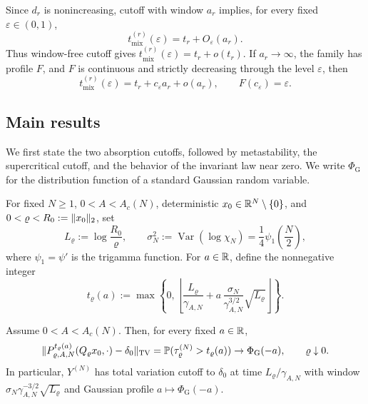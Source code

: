 \documentclass[11pt,reqno,a4paper]{article}
\newcommand{\Pp}{\P}
\newcommand{\TV}{\mathrm{TV}}
\DeclareMathOperator{\Var}{Var}
\begin{document}
\begin{remark}
  Since $d_r$ is nonincreasing, cutoff with window $a_r$ implies, for every
  fixed $\varepsilon\in(0,1)$,
  \begin{equation*}
    t_{\mathrm{mix}}^{(r)}(\varepsilon)
    =
    t_r+O_\varepsilon(a_r).
  \end{equation*}
  Thus window-free cutoff gives
  $t_{\mathrm{mix}}^{(r)}(\varepsilon)=t_r+o(t_r)$. If $a_r\to\infty$, the
  family has profile $F$, and $F$ is continuous and strictly decreasing
  through the level $\varepsilon$, then
  \begin{equation*}
    t_{\mathrm{mix}}^{(r)}(\varepsilon)
    =
    t_r+c_\varepsilon a_r+o(a_r),
    \qquad
    F(c_\varepsilon)=\varepsilon.
  \end{equation*}
\end{remark}

\subsection{Main results}
\label{subsec:main-results}

We first
state the two absorption cutoffs, followed by metastability, the supercritical
cutoff, and the behavior of the invariant law near zero. We write
$\Phi_{\mathrm G}$ for the distribution function of a standard Gaussian
random variable.

For fixed $N\geq1$, $0<A<A_c(N)$, deterministic
$x_0\in\mathbb{R}^N\setminus\{0\}$, and $0<\varrho<R_0:=\lVert x_0\rVert_2$, set
\begin{equation*}
  L_\varrho:=\log\frac{R_0}{\varrho},
  \qquad
  \sigma_N^2:=\Var(\log\chi_N)
  =\frac14\psi_1\left(\frac N2\right),
\end{equation*}
where $\psi_1=\psi'$ is the trigamma function. For $a\in\mathbb{R}$, define the
nonnegative integer
\begin{equation*}
  t_\varrho(a)
  :=
  \max\left\{0,
    \left\lfloor
      \frac{L_\varrho}{\gamma_{A,N}}
      +
      a\,\frac{\sigma_N}{\gamma_{A,N}^{3/2}}\sqrt{L_\varrho}
    \right\rfloor
  \right\} .
\end{equation*}

\begin{theorem}
\label{thm:rounded-gaussian-nearest-cutoff}
  Assume $0<A<A_c(N)$. Then, for every fixed $a\in\mathbb{R}$,
  \begin{equation}\label{eq:rounded-gaussian-nearest-profile}
    \norm{
      P_{\varrho,A,N}^{t_\varrho(a)}(Q_\varrho x_0,\cdot)-\delta_0
    }_{\TV}
    =
    \Pp(\tau_\varrho^{(N)}>t_\varrho(a))
    \to
    \Phi_{\mathrm G}(-a),
    \qquad
    \varrho\downarrow0.
  \end{equation}
  In particular, $Y^{(N)}$ has total variation cutoff to $\delta_0$
  at time $L_\varrho/\gamma_{A,N}$ with window
  $\sigma_N \gamma_{A,N}^{-3/2}\sqrt{L_\varrho}$ and Gaussian profile
  $a\mapsto\Phi_{\mathrm G}(-a)$.
\end{theorem}
\end{document}
